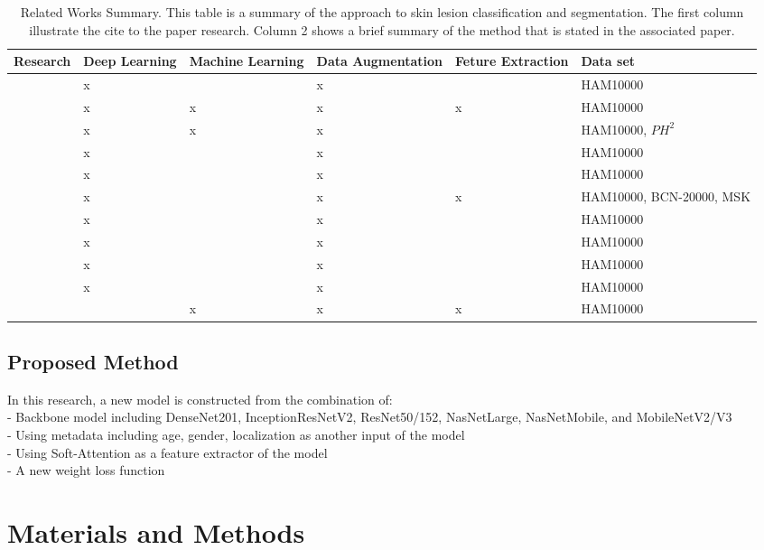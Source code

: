 \documentclass[sensors,article,submit,pdftex,moreauthors]{Definitions/mdpi}
\begin{document}
\begin{table}
	\centering
	\begin{tabular}{| c | p{1.5cm} | p{1.5cm} | p{2cm} | p{1.5cm} | p{2cm} |}
		\hline
		Research & Deep Learning & Machine Learning & Data 
		Augmentation & Feture Extraction & Data set\\
		\hline
		\cite{03358} & x & & x & & HAM10000\\
		\hline
		\cite{03798} & x & x & x & x & HAM10000\\
		\hline
		\cite{10348} & x & x & x & & HAM10000, $PH^2$\\
		\hline
		\cite{09418} & x & & x & & HAM10000\\
		\hline
		\cite{01284} & x & & x & & HAM10000\\
		\hline
		\cite{06612} & x & & x & x & HAM10000, BCN-20000, MSK\\
		\hline
		\cite{03225} & x & & x & & HAM10000\\
		\hline
		\cite{12602} & x & & x & & HAM10000\\
		\hline
		\cite{03426} & x & & x & & HAM10000\\
		\hline
		\cite{03910} & x & & x & & HAM10000\\
		\hline
		\cite{05045} & & x & x & x & HAM10000\\
		\hline
	\end{tabular}
	\caption{Related Works Summary. This table is a summary of the approach to skin lesion classification and segmentation. The first column illustrate the cite to the paper research. Column 2 shows a brief summary of the method that is stated in the associated paper.}
	\label{table:related-work-summary}
\end{table}
\subsection{Proposed Method}
In this research, a new model is constructed from the combination of:\\
- Backbone model including DenseNet201, InceptionResNetV2, ResNet50/152, NasNetLarge, NasNetMobile, and MobileNetV2/V3\\
- Using metadata including age, gender, localization as another input of the model\\
- Using Soft-Attention as a feature extractor of the model\\
- A new weight loss function
\section{Materials and Methods}
\end{document}
